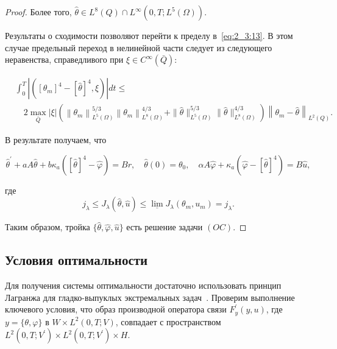 \begin{proof}
    Более того, $\widehat{\theta} \in L^{8}(Q)
    \cap L^{\infty}\left(0, T ; L^{5}(\Omega)\right)$.

    Результаты о сходимости позволяют перейти к пределу в~\eqref{eq:2_3:13}.
    В этом случае предельный переход в
    нелинейной части следует из следующего неравенства,
    справедливого при $\xi \in C^{\infty}(\bar{Q})$:

    \[
        \begin{aligned}
            & \int_{0}^{T}\left|\left(\left[\theta_{m}\right]^{4}
            -[\widehat{\theta}]^{4}, \xi\right)\right| d t \leq \\
            & \quad 2 \max _{\bar{Q}}|\xi|
            \left(\left\|\theta_{m}\right\|_{L^{5}(\Omega)}^{5 / 3}\left\|
            \theta_{m}\right\|_{L^{8}(\Omega)}^{4 / 3}
            + \|\widehat{\theta}\|_{L^{5}(\Omega)}^{5 / 3}
            \|\widehat{\theta}\|_{L^{8}(\Omega)}^{4 / 3}\right)\left\|\theta_{m}
            - \widehat{\theta}\right\|_{L^{2}(Q)}.
        \end{aligned}
    \]


    В результате получаем, что

    \[
        \widehat{\theta}^{\prime}+a A \widehat{\theta}+b
        \kappa_{a}\left([\widehat{\theta}]^{4}-\widehat{\varphi}\right)=B r,
        \quad \widehat{\theta}(0)=\theta_{0},
        \quad \alpha A \widehat{\varphi}+\kappa_{a}\left(\widehat{\varphi}-
        [\widehat{\theta}]^{4}\right)=B \widehat{u},
    \]

    где
    \[
        j_{\lambda} \leq J_{\lambda}(\widehat{\theta},
        \widehat{u}) \leq \underline{\lim }
        J_{\lambda}\left(\theta_{m}, u_{m}\right)=j_{\lambda}.
    \]

    Таким образом, тройка $\{\widehat{\theta}, \widehat{\varphi}, \widehat{u}\}$
    есть решение задачи $(OC)$.
\end{proof}

\subsection{Условия оптимальности}\label{subsec:ch2/sec3/subsec4}
Для получения системы оптимальности достаточно использовать принцип Лагранжа
для гладко-выпуклых экстремальных задач~\cite{10, 11}.
Проверим выполнение ключевого условия,
что образ производной оператора связи $F_{y}^{\prime}(y, u)$,
где $y=\{\theta, \varphi\} \text{ в }  W \times L^{2}(0, T ; V)$,
совпадает с пространством
$L^{2}\left(0, T; V^{\prime}\right) \times L^{2} \left(0, T ; V^{\prime}\right) \times H$.


